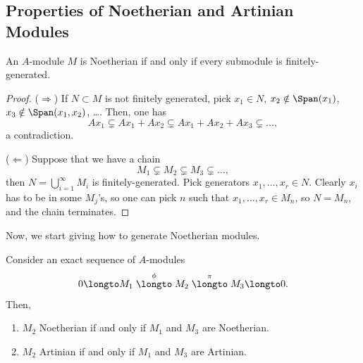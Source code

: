\subsection{Properties of Noetherian and Artinian Modules}
\begin{proposition}
    \label{prop:noetherian_module_fin_gen}
    An $A$-module $M$ is Noetherian if and only if
    every submodule is finitely-generated.
\end{proposition}
\begin{proof}
    ($\Rightarrow$) If $N\subset M$ is not finitely generated,
    pick $x_1\in N$, $x_2\notin\Span(x_1)$,
    $x_3\notin\Span(x_1,x_2)$, \dots.
    Then, one has
    $$Ax_1\subsetneq Ax_1+Ax_2\subsetneq
     Ax_1+Ax_2+Ax_3\subsetneq\dots,$$
     a contradiction.

     ($\Leftarrow$) Suppose that we have a chain
     $$M_1\subsetneq M_2\subsetneq M_3\subsetneq\dots,$$
     then $N=\bigcup_{i=1}^\infty M_i$
     is finitely-generated.
     Pick generators $x_1,\dots,x_r\in N$.
     Clearly $x_i$ has to be in some $M_j$'s,
     so one can pick $n$ such that $x_1,\dots,x_r\in M_n$,
     so $N=M_n$, and the chain terminates.
\end{proof}
Now, we start giving how to generate Noetherian modules.
\begin{proposition}
    \label{prop:chain_condition_exact}
    Consider an exact sequence of $A$-modules
    $$0\longto M_1\stackrel\phi\longto M_2\stackrel\pi\longto M_3\longto 0.$$
    Then,
    \begin{enumerate}[label=(\alph*)]
    \item $M_2$ Noetherian if and only if $M_1$ and $M_3$
	are Noetherian.
    \item $M_2$ Artinian if and only if $M_1$ and $M_3$ 
	are Artinian.
    \end{enumerate}
\end{proposition}
